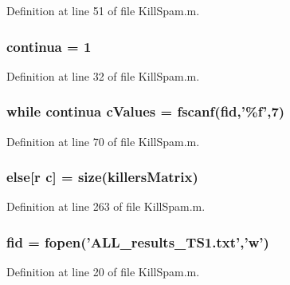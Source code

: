 Definition at line 51 of file Kill\-Spam.\-m.

\hypertarget{a00023_a9c951ebd5bc3f1adce943bee1255f4d6}{
\subsubsection[{continua}]{\setlength{\rightskip}{0pt plus 5cm}continua = 1}}\label{a00023_a9c951ebd5bc3f1adce943bee1255f4d6}


Definition at line 32 of file Kill\-Spam.\-m.

\hypertarget{a00023_ad4ba7701967c1da20171228afccb7081}{
\subsubsection[{c\-Values}]{\setlength{\rightskip}{0pt plus 5cm}while {\bf continua} c\-Values = {\bf fscanf}({\bf fid},'\%{\bf f}',7)}}\label{a00023_ad4ba7701967c1da20171228afccb7081}


Definition at line 70 of file Kill\-Spam.\-m.

\hypertarget{a00023_af5946383720aa572eb93e1e63afc23c2}{
\subsubsection[{else}]{\setlength{\rightskip}{0pt plus 5cm}else\mbox{[}{\bf r} {\bf c}\mbox{]} = {\bf size}({\bf killers\-Matrix})}}\label{a00023_af5946383720aa572eb93e1e63afc23c2}


Definition at line 263 of file Kill\-Spam.\-m.

\hypertarget{a00023_ae9011d40c6f13e68e6f07156e0da7c5d}{
\subsubsection[{fid}]{\setlength{\rightskip}{0pt plus 5cm}fid = fopen('A\-L\-L\-\_\-results\-\_\-\-T\-S1.\-txt','w')}}\label{a00023_ae9011d40c6f13e68e6f07156e0da7c5d}


Definition at line 20 of file Kill\-Spam.\-m.

